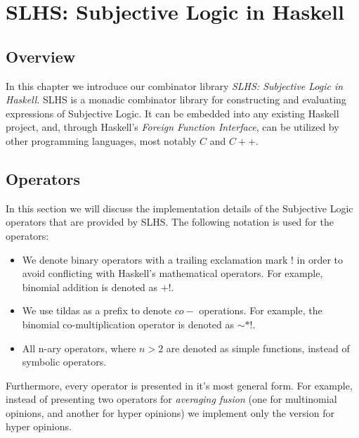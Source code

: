 \documentclass[thesis.tex]{subfiles}
\begin{document}
\chapter{SLHS: Subjective Logic in Haskell}

\section{Overview}

In this chapter we introduce our combinator library \emph{SLHS: Subjective Logic
in Haskell}. SLHS is a monadic combinator library for constructing and evaluating
expressions of Subjective Logic. It can be embedded into any existing Haskell
project, and, through Haskell's \emph{Foreign Function Interface}, can be utilized
by other programming languages, most notably $C$ and $C++$.




%
%











\section{Operators}

In this section we will discuss the implementation details of the Subjective Logic
operators that are provided by SLHS. The following notation is used for the operators:

\begin{itemize}
  \item We denote binary operators with a trailing exclamation mark $!$ in order to
    avoid conflicting with Haskell's mathematical operators. For example, binomial addition
    is denoted as $+!$.
  \item We use tildas as a prefix to denote $co-$ operations. For example, the binomial
    co-multiplication operator is denoted as $\sim *!$.
  \item All n-ary operators, where $n > 2$ are denoted as simple functions, instead of
    symbolic operators.
\end{itemize}

Furthermore, every operator is presented in it's most general form. For example, instead of
presenting two operators for \emph{averaging fusion} (one for multinomial opinions, and another
for hyper opinions) we implement only the version for hyper opinions.








\end{document}
